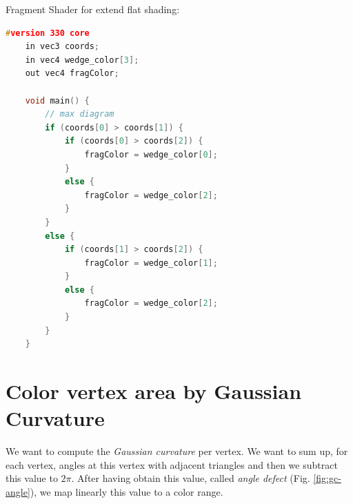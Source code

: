 Fragment Shader for extend flat shading:
\begin{lstlisting}[language=C++,
    directivestyle={\color{black}}
    emph={int,char,double,float,unsigned},
    emphstyle={\color{blue}}
   ]
    #version 330 core
    in vec3 coords;
    in vec4 wedge_color[3];
    out vec4 fragColor;

    void main() {
        // max diagram
        if (coords[0] > coords[1]) {
            if (coords[0] > coords[2]) {
                fragColor = wedge_color[0];
            }
            else {
                fragColor = wedge_color[2];
            }
        }
        else {
            if (coords[1] > coords[2]) {
                fragColor = wedge_color[1];
            }
            else {
                fragColor = wedge_color[2];
            }
        }
    }
\end{lstlisting}

\section{Color vertex area by Gaussian Curvature}
We want to compute the \textit{Gaussian curvature} per vertex. We want to sum up, for each vertex, angles at this vertex with adjacent triangles and then we subtract this value to $2\pi$.
After having obtain this value, called \textit{angle defect} (Fig. \ref{fig:gc-angle}), we map linearly this value to a color range.

